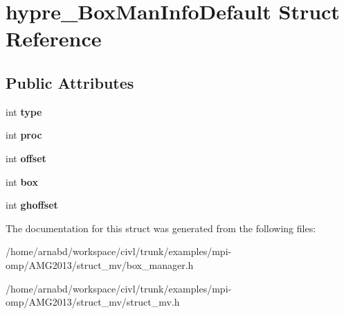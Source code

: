 \hypertarget{structhypre__BoxManInfoDefault}{}\section{hypre\+\_\+\+Box\+Man\+Info\+Default Struct Reference}
\label{structhypre__BoxManInfoDefault}
\subsection*{Public Attributes}
\begin{DoxyCompactItemize}
\item 
\hypertarget{structhypre__BoxManInfoDefault_ac4c882a9b884f9ab81f42000ca932cef}{}int {\bfseries type}\label{structhypre__BoxManInfoDefault_ac4c882a9b884f9ab81f42000ca932cef}

\item 
\hypertarget{structhypre__BoxManInfoDefault_a9f0c74b8447f0778a59dff1de093502f}{}int {\bfseries proc}\label{structhypre__BoxManInfoDefault_a9f0c74b8447f0778a59dff1de093502f}

\item 
\hypertarget{structhypre__BoxManInfoDefault_ad763f839044dd44c2f178e361211c158}{}int {\bfseries offset}\label{structhypre__BoxManInfoDefault_ad763f839044dd44c2f178e361211c158}

\item 
\hypertarget{structhypre__BoxManInfoDefault_a44c4ef9cfd88108e72ed54ef2ae5b9e8}{}int {\bfseries box}\label{structhypre__BoxManInfoDefault_a44c4ef9cfd88108e72ed54ef2ae5b9e8}

\item 
\hypertarget{structhypre__BoxManInfoDefault_a0f8c10e1bbf5e205b8feba58774d1041}{}int {\bfseries ghoffset}\label{structhypre__BoxManInfoDefault_a0f8c10e1bbf5e205b8feba58774d1041}

\end{DoxyCompactItemize}


The documentation for this struct was generated from the following files\+:\begin{DoxyCompactItemize}
\item 
/home/arnabd/workspace/civl/trunk/examples/mpi-\/omp/\+A\+M\+G2013/struct\+\_\+mv/box\+\_\+manager.\+h\item 
/home/arnabd/workspace/civl/trunk/examples/mpi-\/omp/\+A\+M\+G2013/struct\+\_\+mv/struct\+\_\+mv.\+h\end{DoxyCompactItemize}
